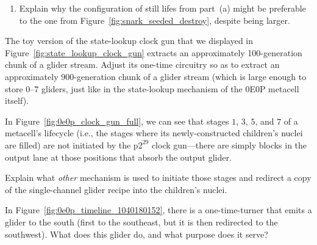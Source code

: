 \begin{multicols}{2}
\begin{problemstar}
\begin{enumerate}[label=\bf\color{ocre}(\alph*)]
			\item Explain why the configuration of still lifes from part~(a) might be preferable to the one from Figure~\ref{fig:snark_seeded_destroy}, despite being larger.
		\end{enumerate}
	\end{problemstar}


	\mfilbreak
	
	
	\begin{problem}\label{exer:0e0p_state_lookup_wider} 
		The toy version of the state-lookup clock gun that we displayed in Figure~\ref{fig:state_lookup_clock_gun} extracts an approximately 100-generation chunk of a glider stream. Adjust its one-time circuitry so as to extract an approximately 900-generation chunk of a glider stream (which is large enough to store $0$--$7$ gliders, just like in the state-lookup mechanism of the 0E0P metacell itself).
	\end{problem}


	\mfilbreak
	
	
	\begin{problem}\label{exer:0e0p_why_blocks_clock_lane} 
		In Figure~\ref{fig:0e0p_clock_gun_full}, we can see that stages $1$, $3$, $5$, and $7$ of a metacell's lifecycle (i.e., the stages where its newly-constructed children's nuclei are filled) are not initiated by the p$2^{29}$ clock gun---there are simply blocks in the output lane at those positions that absorb the output glider.
		
		\noindent Explain what \emph{other} mechanism is used to initiate those stages and redirect a copy of the single-channel glider recipe into the children's nuclei.
	\end{problem}


	\mfilbreak
	
	
	\begin{problemstar}\label{exer:0e0p_extra_south_glider} 
		In Figure~\ref{fig:0e0p_timeline_1040180152}, there is a one-time-turner that emits a glider to the south (first to the southeast, but it is then redirected to the southwest). What does this glider do, and what purpose does it serve?
	\end{problemstar}


	\mfilbreak
	

\end{multicols}
